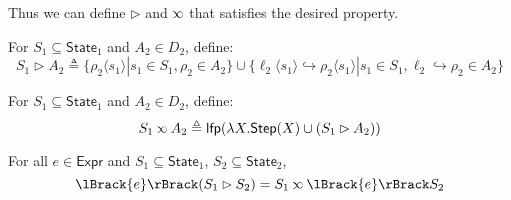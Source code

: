 \documentclass[acmsmall,screen,review]{acmart}\settopmatter{printfolios=true,printccs=false,printacmref=false}
\newcommand*{\Expr}{\mathsf{Expr}}
\newcommand*{\State}{\mathsf{State}}
\newcommand*{\lfp}{\mathsf{lfp}}
\newcommand*{\Step}{\mathsf{Step}}
\newcommand*{\semarrow}{\hookrightarrow}
\newcommand*{\semlink}{\mathbin{\rotatebox[origin=c]{180}{$\propto$}}}
\newcommand*{\sembracket}[1]{\lBrack{#1}\rBrack}
\newcommand*{\inject}[2]{{#2}\langle{#1}\rangle}
\begin{document}
Thus we can define $\rhd$ and $\semlink$ that satisfies the desired property.
\begin{definition}[Injection]
  For $S_1\subseteq\State_1$ and $A_2\in D_2$, define:
  \[
    S_1\rhd A_2\triangleq\{\inject{s_1}{\rho_2}|s_1\in S_1,\rho_2\in A_2\}\cup\{\inject{s_1}{\ell_2}\semarrow\inject{s_1}{\rho_2}|s_1\in S_1,\ell_2\semarrow\rho_2\in A_2\}
  \]
\end{definition}
\begin{definition}
  For $S_1\subseteq\State_1$ and $A_2\in D_2$, define:
  \[
    S_1\semlink A_2\triangleq\lfp(\lambda X.\Step(X)\cup(S_1\rhd A_2))
  \]
\end{definition}
\begin{theorem}[Advance]
  For all $e\in\Expr$ and $S_1\subseteq\State_1$, $S_2\subseteq\State_2$,
  \[
    \sembracket{e}(S_1\rhd S_2)=S_1\semlink\sembracket{e}S_2
  \]
\end{theorem}
\end{document}
